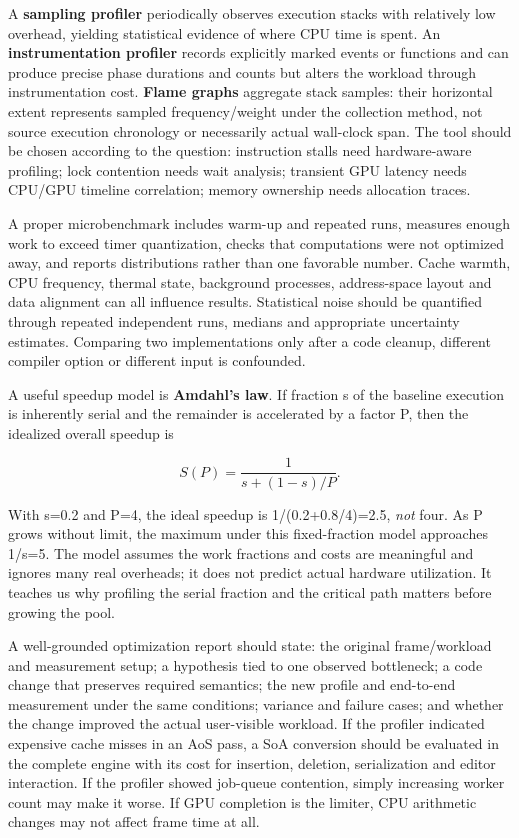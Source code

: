 A \textbf{sampling profiler} periodically observes execution stacks with relatively low overhead, yielding statistical evidence of where CPU time is spent. An \textbf{instrumentation profiler} records explicitly marked events or functions and can produce precise phase durations and counts but alters the workload through instrumentation cost. \textbf{Flame graphs} aggregate stack samples: their horizontal extent represents sampled frequency/weight under the collection method, not source execution chronology or necessarily actual wall-clock span. The tool should be chosen according to the question: instruction stalls need hardware-aware profiling; lock contention needs wait analysis; transient GPU latency needs CPU/GPU timeline correlation; memory ownership needs allocation traces.

A proper microbenchmark includes warm-up and repeated runs, measures enough work to exceed timer quantization, checks that computations were not optimized away, and reports distributions rather than one favorable number. Cache warmth, CPU frequency, thermal state, background processes, address-space layout and data alignment can all influence results. Statistical noise should be quantified through repeated independent runs, medians and appropriate uncertainty estimates. Comparing two implementations only after a code cleanup, different compiler option or different input is confounded.

A useful speedup model is \textbf{Amdahl's law}. If fraction s of the baseline execution is inherently serial and the remainder is accelerated by a factor P, then the idealized overall speedup is

\[
S(P)=\frac{1}{s+(1-s)/P}.
\]

With s=0.2 and P=4, the ideal speedup is 1/(0.2+0.8/4)=2.5, \emph{not} four. As P grows without limit, the maximum under this fixed-fraction model approaches 1/s=5. The model assumes the work fractions and costs are meaningful and ignores many real overheads; it does not predict actual hardware utilization. It teaches us why profiling the serial fraction and the critical path matters before growing the pool.

A well-grounded optimization report should state: the original frame/workload and measurement setup; a hypothesis tied to one observed bottleneck; a code change that preserves required semantics; the new profile and end-to-end measurement under the same conditions; variance and failure cases; and whether the change improved the actual user-visible workload. If the profiler indicated expensive cache misses in an AoS pass, a SoA conversion should be evaluated in the complete engine with its cost for insertion, deletion, serialization and editor interaction. If the profiler showed job-queue contention, simply increasing worker count may make it worse. If GPU completion is the limiter, CPU arithmetic changes may not affect frame time at all.

